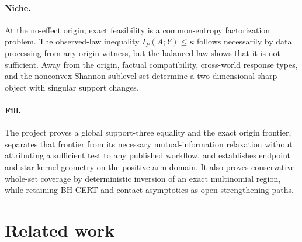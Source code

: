 \documentclass{article}
\begin{document}
\paragraph{Niche.} At the no-effect origin, exact feasibility is a common-entropy factorization problem. The observed-law inequality \(I_P(A;Y)\leq\kappa\) follows necessarily by data processing from any origin witness, but the balanced law shows that it is not sufficient. Away from the origin, factual compatibility, cross-world response types, and the nonconvex Shannon sublevel set determine a two-dimensional sharp object with singular support changes.

\paragraph{Fill.} The project proves a global support-three equality and the exact origin frontier, separates that frontier from its necessary mutual-information relaxation without attributing a sufficient test to any published workflow, and establishes endpoint and star-kernel geometry on the positive-arm domain. It also proves conservative whole-set coverage by deterministic inversion of an exact multinomial region, while retaining BH-CERT and contact asymptotics as open strengthening paths.

\section{Related work}
\end{document}
